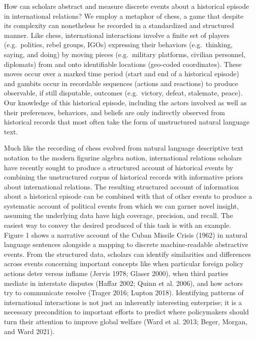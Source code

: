 \documentclass{article}
\begin{document}
How can scholars abstract and measure discrete events about a historical
episode in international relations? We employ a metaphor of chess, a
game that despite its complexity can nonetheless be recorded in a
standardized and structured manner. Like chess, international
interactions involve a finite set of players (e.g.~polities, rebel
groups, IGOs) expressing their behaviors (e.g.~thinking, saying, and
doing) by moving pieces (e.g.~military platforms, civilian personnel,
diplomats) from and onto identifiable locations (geo-coded coordinates).
These moves occur over a marked time period (start and end of a
historical episode) and gambits occur in recordable sequences (actions
and reactions) to produce observable, if still disputable, outcomes
(e.g.~victory, defeat, stalemate, peace). Our knowledge of this
historical episode, including the actors involved as well as their
preferences, behaviors, and beliefs are only indirectly observed from
historical records that most often take the form of unstructured natural
language text.

Much like the recording of chess evolved from natural language
descriptive text notation to the modern figurine algebra notion,
international relations scholars have recently sought to produce a
structured account of historical events by combining the unstructured
corpus of historical records with informative priors about international
relations. The resulting structured account of information about a
historical episode can be combined with that of other events to produce
a systematic account of political events from which we can garner novel
insight, assuming the underlying data have high coverage, precision, and
recall. The easiest way to convey the desired produced of this task is
with an example. Figure 1 shows a narrative account of the Cuban Missile
Crisis (1962) in natural language sentences alongside a mapping to
discrete machine-readable abstractive events. From the structured data,
scholars can identify similarities and differences across events
concerning important concepts like when particular foreign policy
actions deter versus inflame (Jervis 1978; Glaser 2000), when third
parties mediate in interstate disputes (Haffar 2002; Quinn et al. 2006),
and how actors try to communicate resolve (Trager 2016; Lupton 2018).
Identifying patterns of international interactions is not just an
inherently interesting enterprise; it is a necessary precondition to
important efforts to predict where policymakers should turn their
attention to improve global welfare (Ward et al. 2013; Beger, Morgan,
and Ward 2021).
\end{document}
